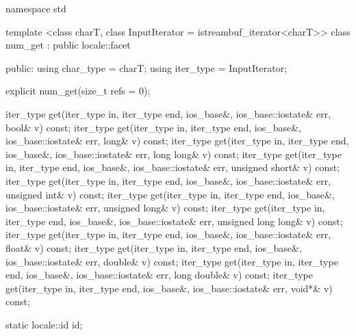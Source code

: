 %
\begin{codeblock}
namespace std {
  template <class charT, class InputIterator = istreambuf_iterator<charT>>
  class num_get : public locale::facet {
  public:
    using char_type = charT;
    using iter_type = InputIterator;

    explicit num_get(size_t refs = 0);

    iter_type get(iter_type in, iter_type end, ios_base&,
                  ios_base::iostate& err, bool& v) const;
    iter_type get(iter_type in, iter_type end, ios_base&,
                  ios_base::iostate& err, long& v) const;
    iter_type get(iter_type in, iter_type end, ios_base&,
                  ios_base::iostate& err, long long& v) const;
    iter_type get(iter_type in, iter_type end, ios_base&,
                  ios_base::iostate& err, unsigned short& v) const;
    iter_type get(iter_type in, iter_type end, ios_base&,
                  ios_base::iostate& err, unsigned int& v) const;
    iter_type get(iter_type in, iter_type end, ios_base&,
                  ios_base::iostate& err, unsigned long& v) const;
    iter_type get(iter_type in, iter_type end, ios_base&,
                  ios_base::iostate& err, unsigned long long& v) const;
    iter_type get(iter_type in, iter_type end, ios_base&,
                  ios_base::iostate& err, float& v) const;
    iter_type get(iter_type in, iter_type end, ios_base&,
                  ios_base::iostate& err, double& v) const;
    iter_type get(iter_type in, iter_type end, ios_base&,
                  ios_base::iostate& err, long double& v) const;
    iter_type get(iter_type in, iter_type end, ios_base&,
                  ios_base::iostate& err, void*& v) const;

    static locale::id id;

}}
\end{codeblock}
